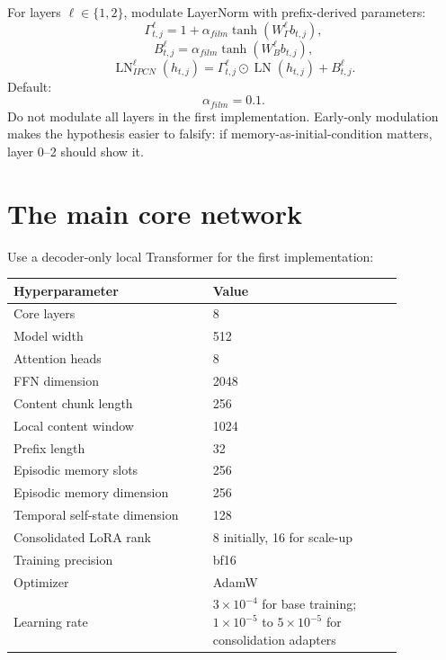 \documentclass[11pt]{article}
\newcommand{\LN}{\operatorname{LN}}
\begin{document}
For layers \(\ell\in\{1,2\}\), modulate LayerNorm with prefix-derived parameters:
\begin{equation}
    \Gamma_{t,j}^{\ell}=1+\alpha_{film}\tanh(W_\Gamma^\ell b_{t,j}),
\end{equation}
\begin{equation}
    B_{t,j}^{\ell}=\alpha_{film}\tanh(W_B^\ell b_{t,j}),
\end{equation}
\begin{equation}
    \operatorname{LN}_{IPCN}^{\ell}(h_{t,j})=\Gamma_{t,j}^{\ell}\odot \LN(h_{t,j})+B_{t,j}^{\ell}.
\end{equation}
Default:
\begin{equation}
    \alpha_{film}=0.1.
\end{equation}
Do not modulate all layers in the first implementation. Early-only modulation makes the hypothesis easier to falsify: if memory-as-initial-condition matters, layer 0--2 should show it.

\section{The main core network}

Use a decoder-only local Transformer for the first implementation:
\begin{longtable}{p{0.44\linewidth}p{0.42\linewidth}}
\toprule
\textbf{Hyperparameter} & \textbf{Value}\\
\midrule
Core layers & 8 \\
Model width & 512 \\
Attention heads & 8 \\
FFN dimension & 2048 \\
Content chunk length & 256 \\
Local content window & 1024 \\
Prefix length & 32 \\
Episodic memory slots & 256 \\
Episodic memory dimension & 256 \\
Temporal self-state dimension & 128 \\
Consolidated LoRA rank & 8 initially, 16 for scale-up \\
Training precision & bf16 \\
Optimizer & AdamW \\
Learning rate & \(3\times 10^{-4}\) for base training; \(1\times10^{-5}\) to \(5\times10^{-5}\) for consolidation adapters \\
\bottomrule
\end{longtable}
\end{document}
